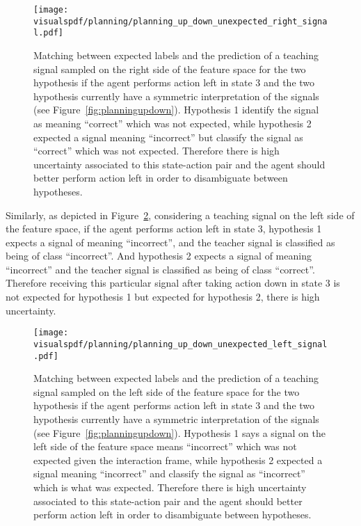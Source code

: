 \begin{figure}[H]
  \centering
  \texttt{[image: \\visualspdf/planning/planning\_up\_down\_unexpected\_right\_signal.pdf]}
  \caption{Matching between expected labels and the prediction of a teaching signal sampled on the right side of the feature space for the two hypothesis if the agent performs action left in state 3 and the two hypothesis currently have a symmetric interpretation of the signals (see Figure~\ref{fig:planningupdown}). Hypothesis 1 identify the signal as meaning ``correct'' which was not expected, while hypothesis 2 expected a signal meaning ``incorrect'' but classify the signal as ``correct'' which was not expected. Therefore there is high uncertainty associated to this state-action pair and the agent should better perform action left in order to disambiguate between hypotheses.}
  \label{fig:uncertaintymeaningupdownunexpectedright}
\end{figure}

\visuopti{\newpage}

Similarly, as depicted in Figure~\ref{fig:uncertaintymeaningupdownunexpectedleft}, considering a teaching signal on the left side of the feature space, if the agent performs action left in state 3, hypothesis 1 expects a signal of meaning ``incorrect'', and the teacher signal is classified as being of class ``incorrect''. And hypothesis 2 expects a signal of meaning ``incorrect'' and the teacher signal is classified as being of class ``correct''. Therefore receiving this particular signal after taking action down in state 3 is not expected for hypothesis 1 but expected for hypothesis 2, there is high uncertainty.

\begin{figure}[H]
  \centering
  \texttt{[image: \\visualspdf/planning/planning\_up\_down\_unexpected\_left\_signal.pdf]}
  \caption{Matching between expected labels and the prediction of a teaching signal sampled on the left side of the feature space for the two hypothesis if the agent performs action left in state 3 and the two hypothesis currently have a symmetric interpretation of the signals (see Figure~\ref{fig:planningupdown}). Hypothesis 1 says a signal on the left side of the feature space means ``incorrect'' which was not expected given the interaction frame, while hypothesis 2 expected a signal meaning ``incorrect'' and classify the signal as ``incorrect'' which is what was expected. Therefore there is high uncertainty associated to this state-action pair and the agent should better perform action left in order to disambiguate between hypotheses.}
  \label{fig:uncertaintymeaningupdownunexpectedleft}
\end{figure}

